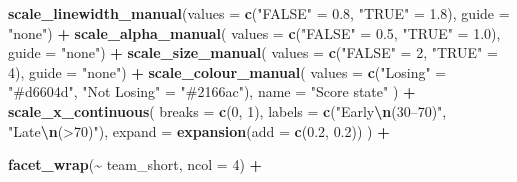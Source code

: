 \documentclass[
]{article}
\newenvironment{Shaded}{\begin{snugshade}}{\end{snugshade}}
\newcommand{\AttributeTok}[1]{\textcolor[rgb]{0.13,0.29,0.53}{#1}}
\newcommand{\DecValTok}[1]{\textcolor[rgb]{0.00,0.00,0.81}{#1}}
\newcommand{\FloatTok}[1]{\textcolor[rgb]{0.00,0.00,0.81}{#1}}
\newcommand{\FunctionTok}[1]{\textcolor[rgb]{0.13,0.29,0.53}{\textbf{#1}}}
\newcommand{\NormalTok}[1]{#1}
\newcommand{\OtherTok}[1]{\textcolor[rgb]{0.56,0.35,0.01}{#1}}
\newcommand{\SpecialCharTok}[1]{\textcolor[rgb]{0.81,0.36,0.00}{\textbf{#1}}}
\newcommand{\StringTok}[1]{\textcolor[rgb]{0.31,0.60,0.02}{#1}}
\begin{document}
\begin{Shaded}
\begin{Highlighting}[]
  \FunctionTok{scale\_linewidth\_manual}\NormalTok{(}\AttributeTok{values =} \FunctionTok{c}\NormalTok{(}\StringTok{"FALSE"} \OtherTok{=} \FloatTok{0.8}\NormalTok{, }\StringTok{"TRUE"} \OtherTok{=} \FloatTok{1.8}\NormalTok{),}
                         \AttributeTok{guide =} \StringTok{"none"}\NormalTok{) }\SpecialCharTok{+}
  \FunctionTok{scale\_alpha\_manual}\NormalTok{(    }\AttributeTok{values =} \FunctionTok{c}\NormalTok{(}\StringTok{"FALSE"} \OtherTok{=} \FloatTok{0.5}\NormalTok{, }\StringTok{"TRUE"} \OtherTok{=} \FloatTok{1.0}\NormalTok{),}
                         \AttributeTok{guide =} \StringTok{"none"}\NormalTok{) }\SpecialCharTok{+}
  \FunctionTok{scale\_size\_manual}\NormalTok{(     }\AttributeTok{values =} \FunctionTok{c}\NormalTok{(}\StringTok{"FALSE"} \OtherTok{=} \DecValTok{2}\NormalTok{,   }\StringTok{"TRUE"} \OtherTok{=} \DecValTok{4}\NormalTok{),}
                         \AttributeTok{guide =} \StringTok{"none"}\NormalTok{) }\SpecialCharTok{+}
  \FunctionTok{scale\_colour\_manual}\NormalTok{(}
    \AttributeTok{values =} \FunctionTok{c}\NormalTok{(}\StringTok{"Losing"} \OtherTok{=} \StringTok{"\#d6604d"}\NormalTok{, }\StringTok{"Not Losing"} \OtherTok{=} \StringTok{"\#2166ac"}\NormalTok{),}
    \AttributeTok{name   =} \StringTok{"Score state"}
\NormalTok{  ) }\SpecialCharTok{+}
  \FunctionTok{scale\_x\_continuous}\NormalTok{(}
    \AttributeTok{breaks =} \FunctionTok{c}\NormalTok{(}\DecValTok{0}\NormalTok{, }\DecValTok{1}\NormalTok{),}
    \AttributeTok{labels =} \FunctionTok{c}\NormalTok{(}\StringTok{"Early}\SpecialCharTok{\textbackslash{}n}\StringTok{(30–70\textquotesingle{})"}\NormalTok{, }\StringTok{"Late}\SpecialCharTok{\textbackslash{}n}\StringTok{(\textgreater{}70\textquotesingle{})"}\NormalTok{),}
    \AttributeTok{expand =} \FunctionTok{expansion}\NormalTok{(}\AttributeTok{add =} \FunctionTok{c}\NormalTok{(}\FloatTok{0.2}\NormalTok{, }\FloatTok{0.2}\NormalTok{))}
\NormalTok{  ) }\SpecialCharTok{+}
  
  \FunctionTok{facet\_wrap}\NormalTok{(}\SpecialCharTok{\textasciitilde{}}\NormalTok{ team\_short, }\AttributeTok{ncol =} \DecValTok{4}\NormalTok{) }\SpecialCharTok{+}
  

\end{Highlighting}
\end{Shaded}
\end{document}
